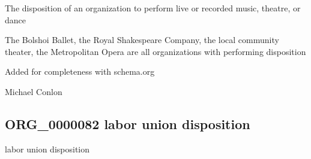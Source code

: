\documentclass[letterpaper,10pt,english]{sphinxmanual}
\begin{document}
\begin{sphinxShadowBox}

\sphinxAtStartPar
The disposition of an organization to perform live or recorded music, theatre, or dance
\end{sphinxShadowBox}

\begin{sphinxShadowBox}

\sphinxAtStartPar
{}
\end{sphinxShadowBox}

\begin{sphinxShadowBox}

\sphinxAtStartPar
The Bolshoi Ballet, the Royal Shakespeare Company, the local community theater, the Metropolitan Opera are all organizations with performing disposition
\end{sphinxShadowBox}

\begin{sphinxShadowBox}

\sphinxAtStartPar
Added for completeness with schema.org
\end{sphinxShadowBox}

\begin{sphinxShadowBox}

\sphinxAtStartPar
Michael Conlon 
\end{sphinxShadowBox}
\begin{quote}

\ignorespaces \end{quote}


\subsection{ORG\_0000082 \sphinxhyphen{} labor union disposition}
\label{\detokenize{doc-ORG_0000082:org-0000082-labor-union-disposition}}\label{\detokenize{doc-ORG_0000082:index-0}}\label{\detokenize{doc-ORG_0000082::doc}}
\begin{sphinxShadowBox}

\sphinxAtStartPar
labor union disposition
\end{sphinxShadowBox}
\end{document}
